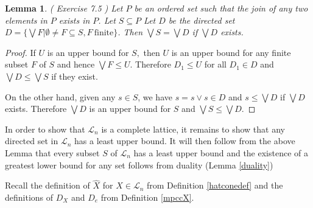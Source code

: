 \documentclass[psamsfonts]{amsart}
\numberwithin{equation}{subsection}
\theoremstyle{plain}
\newtheorem{lemma}[theorem]{Lemma}
\theoremstyle{definition}
\theoremstyle{remark}
\begin{document}
\begin{lemma} {( Exercise 7.5 \cite{DnP})} Let $P$ be an ordered set such that  the join of any two elements in $P$ exists in $P$. Let $S \subseteq P$  Let $D$ be the directed set  $D = \{\bigvee F |
\emptyset \not= F \subseteq S, F \  \mbox{finite} \}$.  Then $\bigvee S = \bigvee D$ if $\bigvee D$ exists. 
\end{lemma}
\begin{proof} If $U$ is an upper bound for $S,$ then $U$ is an upper bound for any finite subset $F$ of $S$
and hence  $\bigvee F \leq  U$. Therefore $D_1 \leq U$ for all $D_1 \in D$ and  $\bigvee D \leq  \bigvee S$
if they exist. 

On the other hand, given any $s \in S$, we have $s = s \vee s \in D$ and $s \leq \bigvee D$ if $\bigvee D$ exists. 
Therefore $\bigvee D$ is an upper bound for $S$ and $\bigvee S \leq \bigvee D$. 
\end{proof}

In order to show that $\mathcal{L}_{n }$ is a complete lattice, it remains to show that any directed set in $\mathcal{L}_{n }$
has a least upper bound. It will then follow from the above Lemma  that every subset $S$ of $\mathcal{L}_{n }$ has a least upper bound and the existence of a greatest lower bound for any set follows from duality (Lemma \ref{duality})

 Recall the definition of $\widehat{X}$ for $X \in \mathcal{L}_n$ from Definition \ref{hatconedef} and the definitions of $D_X$ and $D_e$ from 
 Definition \ref{mpccX}.
 
\end{document}
